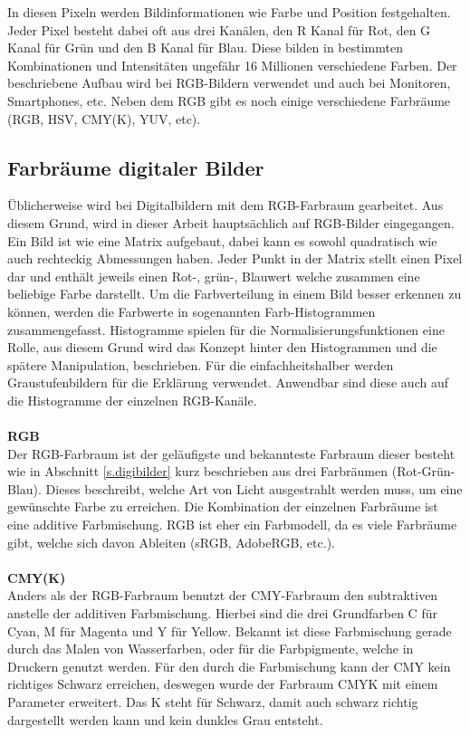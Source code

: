 In diesen Pixeln werden Bildinformationen wie Farbe und Position festgehalten. Jeder Pixel besteht dabei oft aus drei Kanälen, den R Kanal für Rot, den G Kanal für Grün und den B Kanal für Blau. Diese bilden in bestimmten Kombinationen und Intensitäten ungefähr 16 Millionen verschiedene Farben. Der beschriebene Aufbau wird bei RGB-Bildern verwendet und auch bei Monitoren, Smartphones, etc. Neben dem RGB gibt es noch einige verschiedene Farbräume (RGB, HSV, CMY(K), YUV, etc).
\subsection{Farbräume digitaler Bilder}\label{s.aufbdigibilder}
Üblicherweise wird bei Digitalbildern mit dem RGB-Farbraum gearbeitet. Aus diesem Grund, wird in dieser Arbeit hauptsächlich auf RGB-Bilder eingegangen. Ein Bild ist wie eine Matrix aufgebaut, dabei kann es sowohl quadratisch wie auch rechteckig Abmessungen haben. Jeder Punkt in der Matrix stellt einen Pixel dar und enthält jeweils einen Rot-, grün-, Blauwert welche zusammen eine beliebige Farbe darstellt. Um die Farbverteilung in einem Bild besser erkennen zu können, werden die Farbwerte in sogenannten Farb-Histogrammen zusammengefasst. Histogramme spielen für die Normalisierungsfunktionen eine Rolle, aus diesem Grund wird das Konzept hinter den Histogrammen und die spätere Manipulation, beschrieben. Für die einfachheitshalber werden Graustufenbildern für die Erklärung verwendet. Anwendbar sind diese auch auf die Histogramme der einzelnen RGB-Kanäle.\\\\
\textbf{RGB}\label{s.rgb}\\
Der RGB-Farbraum ist der geläufigste und bekannteste Farbraum dieser besteht wie in Abschnitt \ref{s.digibilder} kurz beschrieben aus drei Farbräumen (Rot-Grün-Blau). Dieses beschreibt, welche Art von Licht ausgestrahlt werden muss, um eine gewünschte Farbe zu erreichen. Die Kombination der einzelnen Farbräume ist eine additive Farbmischung. RGB ist eher ein Farbmodell, da es viele Farbräume gibt, welche sich davon Ableiten (sRGB, AdobeRGB, etc.).\\\\
\textbf{CMY(K)}\label{s.cmy}\\
Anders als der RGB-Farbraum benutzt der CMY-Farbraum den subtraktiven anstelle der additiven Farbmischung. Hierbei sind die drei Grundfarben C für Cyan, M für Magenta und Y für Yellow. Bekannt ist diese Farbmischung gerade durch das Malen von Wasserfarben, oder für die Farbpigmente, welche in Druckern genutzt werden. Für den durch die Farbmischung kann der CMY kein richtiges Schwarz erreichen, deswegen wurde der Farbraum CMYK mit einem Parameter erweitert. Das K steht für Schwarz, damit auch schwarz richtig dargestellt werden kann und kein dunkles Grau entsteht.\\\\
